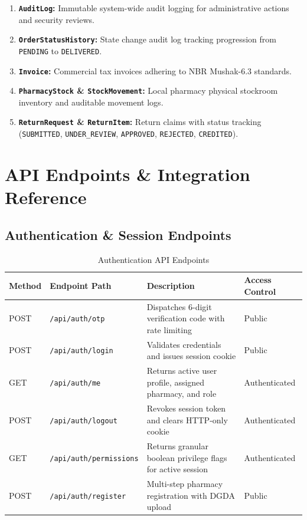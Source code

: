 \documentclass[10pt,a4paper]{article}
\begin{document}
\begin{enumerate}[leftmargin=*]
    \item \textbf{\texttt{AuditLog}:} Immutable system-wide audit logging for administrative actions and security reviews.
    \item \textbf{\texttt{OrderStatusHistory}:} State change audit log tracking progression from \texttt{PENDING} to \texttt{DELIVERED}.
    \item \textbf{\texttt{Invoice}:} Commercial tax invoices adhering to NBR Mushak-6.3 standards.
    \item \textbf{\texttt{PharmacyStock} \& \texttt{StockMovement}:} Local pharmacy physical stockroom inventory and auditable movement logs.
    \item \textbf{\texttt{ReturnRequest} \& \texttt{ReturnItem}:} Return claims with status tracking (\texttt{SUBMITTED}, \texttt{UNDER\_REVIEW}, \texttt{APPROVED}, \texttt{REJECTED}, \texttt{CREDITED}).
\end{enumerate}

\section{API Endpoints \& Integration Reference}

\subsection{Authentication \& Session Endpoints}
\begin{table}[h!]
\centering
\small
\begin{tabularx}{\textwidth}{lp{4.0cm}Xp{2.5cm}}
\toprule
\textbf{Method} & \textbf{Endpoint Path} & \textbf{Description} & \textbf{Access Control} \\
\midrule
POST & \texttt{/api/auth/otp} & Dispatches 6-digit verification code with rate limiting & Public \\
POST & \texttt{/api/auth/login} & Validates credentials and issues session cookie & Public \\
GET & \texttt{/api/auth/me} & Returns active user profile, assigned pharmacy, and role & Authenticated \\
POST & \texttt{/api/auth/logout} & Revokes session token and clears HTTP-only cookie & Authenticated \\
GET & \texttt{/api/auth/permissions} & Returns granular boolean privilege flags for active session & Authenticated \\
POST & \texttt{/api/auth/register} & Multi-step pharmacy registration with DGDA upload & Public \\
\bottomrule
\end{tabularx}
\caption{Authentication API Endpoints}
\end{table}
\end{document}
